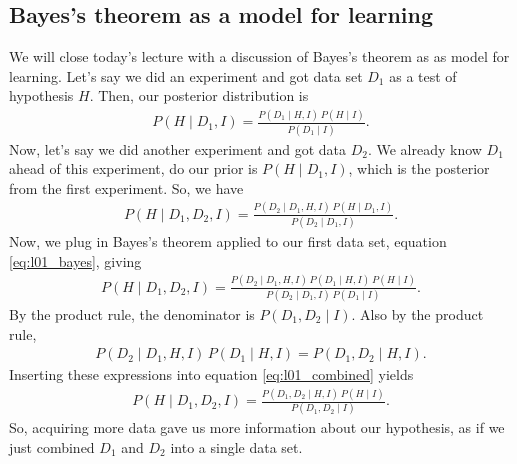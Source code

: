 \subsection{Bayes's theorem as a model for learning}
We will close today's lecture with a discussion of Bayes's theorem as
as model for learning.  Let's say we did an experiment and got data
set $D_1$ as a test of hypothesis $H$.  Then, our posterior
distribution is
\begin{align}
P(H\mid D_1, I) = \frac{P(D_1 \mid H, I)\, P(H \mid I)}{P(D_1 \mid I)}.
\label{eq:l01_bayes}
\end{align}
Now, let's say we did another experiment and got data $D_2$.  We
already know $D_1$ ahead of this experiment, do our prior is
$P(H\mid D_1, I)$, which is the posterior from the first experiment.
So, we have
\begin{align}
  P(H\mid D_1, D_2, I) = \frac{P(D_2 \mid D_1, H, I)\, P(H \mid D_1, I)}{P(D_2 \mid D_1, I)}.
\end{align}
Now, we plug in Bayes's theorem applied to our first data set,
equation \eqref{eq:l01_bayes}, giving
\begin{align}
P(H\mid D_1, D_2, I) = \frac{P(D_2 \mid D_1, H, I)\,P(D_1 \mid H, I)\, P(H \mid I)}{P(D_2 \mid D_1, I)\, P(D_1 \mid I)}.
\label{eq:l01_combined}
\end{align}
By the product rule, the denominator is $P(D_1, D_2 \mid I)$.  Also by
the product rule,
\begin{align}
P(D_2 \mid D_1, H, I)\,P(D_1 \mid H, I) = P(D_1, D_2 \mid H, I).
\end{align}
Inserting these expressions into equation \eqref{eq:l01_combined}
yields
\begin{align}
  P(H\mid D_1, D_2, I) = \frac{P(D_1, D_2 \mid H, I)\,P(H\mid I)}{P(D_1, D_2 \mid I)}.
\end{align}
So, acquiring more data gave us more information about our hypothesis,
as if we just combined $D_1$ and $D_2$ into a single data set.
